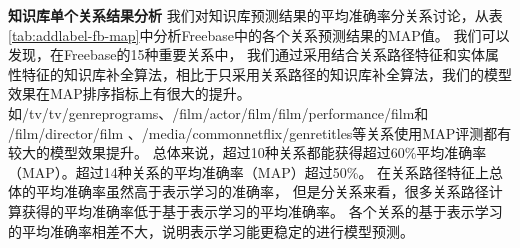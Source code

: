 \textbf{知识库单个关系结果分析}
我们对知识库预测结果的平均准确率分关系讨论，从表\ref{tab:addlabel-fb-map}中分析Freebase中的各个关系预测结果的MAP值。
我们可以发现，在Freebase的15种重要关系中，
我们通过采用结合关系路径特征和实体属性特征的知识库补全算法，相比于只采用关系路径的知识库补全算法，我们的模型效果在MAP排序指标上有很大的提升。如/tv/tv/genreprograms、/film/actor/film/film/performance/film和 /film/director/film 、/media/commonnetflix/genretitles等关系使用MAP评测都有较大的模型效果提升。
总体来说，超过10种关系都能获得超过60\%平均准确率（MAP）。超过14种关系的平均准确率（MAP）超过50\%。
在关系路径特征上总体的平均准确率虽然高于表示学习的准确率，
但是分关系来看，很多关系路径计算获得的平均准确率低于基于表示学习的平均准确率。
各个关系的基于表示学习的平均准确率相差不大，说明表示学习能更稳定的进行模型预测。

